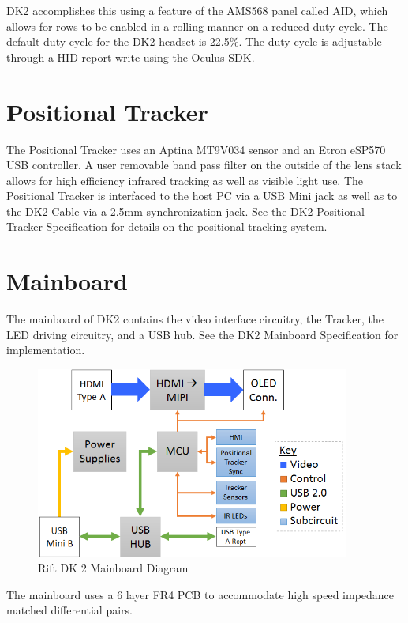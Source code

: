 \documentclass[letterpaper]{article}
\begin{document}
DK2 accomplishes this using a feature of the AMS568 panel called AID, which allows for rows to be enabled in a rolling manner on a reduced duty cycle.  The default duty cycle for the DK2 headset is 22.5\%.  The duty cycle is adjustable through a HID report write using the Oculus SDK.

\newpage

\section{Positional Tracker}
The Positional Tracker uses an Aptina MT9V034 sensor and an Etron eSP570 USB controller.  A user removable band pass filter on the outside of the lens stack allows for high efficiency infrared tracking as well as visible light use.  The Positional Tracker is interfaced to the host PC via a USB Mini jack as well as to the DK2 Cable via a 2.5mm synchronization jack.  See the DK2 Positional Tracker Specification for details on the positional tracking system.

\newpage

\section{Mainboard}
The mainboard of DK2 contains the video interface circuitry, the Tracker, the LED driving circuitry, and a USB hub.  See the DK2 Mainboard Specification for implementation.

\begin{figure}[H]  
  \centering
    \includegraphics[width=0.92\textwidth]{Figures/DK2_Mainboard.png}
  \caption{Rift DK 2 Mainboard Diagram}
  \label{Mainboard_Diagram}
\end{figure}

The mainboard uses a 6 layer FR4 PCB to accommodate high speed impedance matched differential pairs.
\end{document}
